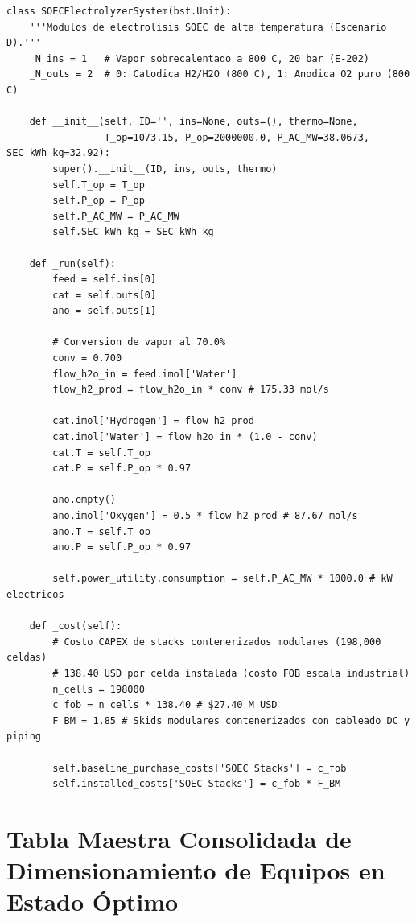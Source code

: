 \documentclass[11pt,letterpaper]{article}
\begin{document}
\begin{lstlisting}[caption={Clase personalizada SOECElectrolyzerSystem en BioSTEAM}, basicstyle=\ttfamily\scriptsize\color{darkslate}]
class SOECElectrolyzerSystem(bst.Unit):
    '''Modulos de electrolisis SOEC de alta temperatura (Escenario D).'''
    _N_ins = 1   # Vapor sobrecalentado a 800 C, 20 bar (E-202)
    _N_outs = 2  # 0: Catodica H2/H2O (800 C), 1: Anodica O2 puro (800 C)
    
    def __init__(self, ID='', ins=None, outs=(), thermo=None,
                 T_op=1073.15, P_op=2000000.0, P_AC_MW=38.0673, SEC_kWh_kg=32.92):
        super().__init__(ID, ins, outs, thermo)
        self.T_op = T_op
        self.P_op = P_op
        self.P_AC_MW = P_AC_MW
        self.SEC_kWh_kg = SEC_kWh_kg

    def _run(self):
        feed = self.ins[0]
        cat = self.outs[0]
        ano = self.outs[1]
        
        # Conversion de vapor al 70.0%
        conv = 0.700
        flow_h2o_in = feed.imol['Water']
        flow_h2_prod = flow_h2o_in * conv # 175.33 mol/s
        
        cat.imol['Hydrogen'] = flow_h2_prod
        cat.imol['Water'] = flow_h2o_in * (1.0 - conv)
        cat.T = self.T_op
        cat.P = self.P_op * 0.97
        
        ano.empty()
        ano.imol['Oxygen'] = 0.5 * flow_h2_prod # 87.67 mol/s
        ano.T = self.T_op
        ano.P = self.P_op * 0.97
        
        self.power_utility.consumption = self.P_AC_MW * 1000.0 # kW electricos

    def _cost(self):
        # Costo CAPEX de stacks contenerizados modulares (198,000 celdas)
        # 138.40 USD por celda instalada (costo FOB escala industrial)
        n_cells = 198000
        c_fob = n_cells * 138.40 # $27.40 M USD
        F_BM = 1.85 # Skids modulares contenerizados con cableado DC y piping
        
        self.baseline_purchase_costs['SOEC Stacks'] = c_fob
        self.installed_costs['SOEC Stacks'] = c_fob * F_BM
\end{lstlisting}

\newpage

\section{Tabla Maestra Consolidada de Dimensionamiento de Equipos en Estado Óptimo}
\end{document}
